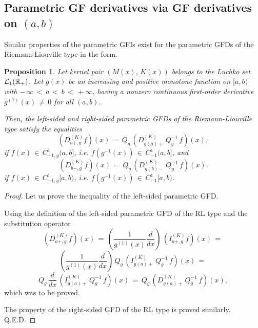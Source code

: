 \documentclass[12pt]{article}
\newtheorem{Proposition}{Proposition}
\begin{document}


\subsection{Parametric GF derivatives via GF derivatives on $(a,b)$}


Similar properties of the parametric GFIs
exist for the parametric GFDs of the Riemann-Liouville type in the form.

\begin{Proposition} \label{D-QDQ-RL}
Let kernel pair $(M(x), \, K(x))$ belongs to the Luchko set ${\cal L}_{1}(\mathbb{R}_{+})$.
Let $g(x)$ be an increasing and positive monotone function on $[a, b)$ 
with $ - \, \infty \, < \, a \, < \, b \, < \, +\infty$, 
having a nonzero continuous first-order derivative $g^{(1)}(x) \, \ne \, 0$ for all $(a,b)$.

Then, the left-sided and right-sided parametric GFDs of the Riemann-Liouville type satisfy the equalities
\begin{equation}
(D^{(K)}_{a+,g} f)(x) \, = \, 
Q_{g} \, (D^{(K)}_{g(a)+} \, Q^{-1}_g \, f)(x) ,
\end{equation}
if $f(x) \, \in \, C^{1}_{-1,g}(a,b]$, i.e. 
$f(g^{-1}(x)) \, \in \, C^{1}_{-1}(a,b]$, and 
\begin{equation}
(D^{(K)}_{b-,g} f)(x) \, = \, 
Q_{g} \, (D^{(K)}_{g(b)-} \, Q^{-1}_g \, f)(x) .
\end{equation}
if $f(x) \, \in \, C^{1}_{-1,g}[a,b)$, i.e. 
$f(g^{-1}(x)) \, \in \, C^{1}_{-1}[a,b)$. 
\end{Proposition}

\begin{proof}
Let us prove the inequality of the left-sided parametric GFD.

Using the definition of the left-sided parametric GFD of the RL type and the substitution operator
\[
(D^{(K)}_{a+,g} f)(x) \, = \, 
\left(\frac{1}{g^{(1)}(x)} \frac{d}{dx} \right) \, 
(I^{(K)}_{a+,g} f)(x) \, = \, 
\]
\[
\left(\frac{1}{g^{(1)}(x)} \frac{d}{dx} \right) \, 
Q_g \, (I^{(K)}_{g(a)+} \, Q^{-1}_g \, f)(x) \, = \, 
\]
\[
Q_g \, \frac{d}{d x} \, (I^{(K)}_{g(a)+} \, Q^{-1}_g \, f)(x) \, = \, 
Q_g \, \left( D^{(K)}_{g(a)+} \, Q^{-1}_g \, f \right) (x) ,
\]
which was to be proved. 

The property of the right-sided GFD of the RL type is proved similarly.
Q.E.D.
\end{proof}
\end{document}
